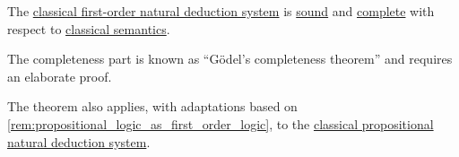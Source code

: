 \begin{theorem}\label{thm:classical_first_order_logic_soundness_and_complete}
  The \hyperref[def:first_order_natural_deduction_system]{classical first-order natural deduction system} is \hyperref[def:abstract_logic/soundness]{sound} and \hyperref[def:abstract_logic/completeness]{complete} with respect to \hyperref[def:first_order_semantics]{classical semantics}.
\end{theorem}
\begin{comments}
  \item The completeness part is known as \enquote{G\"odel's completeness theorem} and requires an elaborate proof.
  \item The theorem also applies, with adaptations based on \cref{rem:propositional_logic_as_first_order_logic}, to the \hyperref[def:propositional_natural_deduction_systems]{classical propositional natural deduction system}.
\end{comments}
